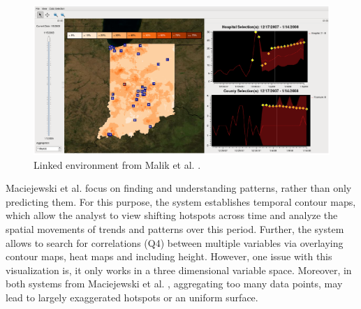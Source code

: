 \documentclass[electronic]{vgtc}             %
\begin{document}
\begin{figure}[b]
	\centering
	\includegraphics[width=\columnwidth]{Hotspot}
	\caption{Linked environment from Malik et al. \cite{maciejewski:2011}. 
	}
	\label{fig:hotspot}
\end{figure}
Maciejewski et al. \cite{maciejewski:2010} focus on finding and understanding patterns, rather than only predicting them.
For this purpose, the system establishes temporal contour maps, which allow the analyst to view shifting hotspots across time and analyze the spatial movements of trends and patterns over this period.
Further, the system allows to search for correlations (Q4) between multiple variables via overlaying contour maps, heat maps and including height. 
However, one issue with this visualization is, it only works in a three dimensional variable space.
Moreover, in both systems from Maciejewski et al. \cite{maciejewski:2010, maciejewski:2011}, aggregating too many data points, may lead to largely exaggerated hotspots or an uniform surface. 
\end{document}

